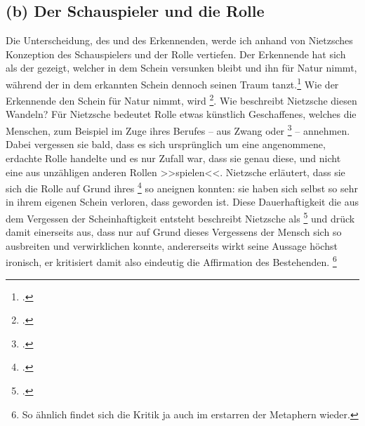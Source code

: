 \documentclass[12pt, a4paper, openany]{report}
\begin{document}
\subsection{(b) Der Schauspieler und die Rolle}
Die Unterscheidung, des  und des Erkennenden, werde ich anhand von Nietzsches Konzeption des Schauspielers und der Rolle vertiefen. 
Der Erkennende hat sich als der gezeigt, welcher in dem Schein versunken bleibt und ihn für Natur nimmt, während der  in dem erkannten Schein dennoch seinen Traum tanzt.\footcite[Vgl.][417]{nietzsche_morgenrote_1999}
Wie der Erkennende den Schein für Natur nimmt, wird \footcite[][595]{nietzsche_morgenrote_1999}.
Wie beschreibt Nietzsche diesen Wandeln?
Für Nietzsche bedeutet Rolle etwas künstlich Geschaffenes, welches die Menschen, zum Beispiel im Zuge ihres Berufes -- aus Zwang oder \footcite[][595]{nietzsche_morgenrote_1999} -- annehmen. 
Dabei vergessen sie bald, dass es sich ursprünglich um eine angenommene, erdachte Rolle handelte und es nur Zufall war, dass sie genau diese, und nicht eine aus unzähligen anderen Rollen >>spielen<<.
Nietzsche erläutert, dass sie sich die Rolle auf Grund ihres \footcite[][595]{nietzsche_morgenrote_1999} so aneignen konnten:
sie haben sich selbst so sehr in ihrem eigenen Schein verloren, dass  geworden ist. 
Diese Dauerhaftigkeit die aus dem Vergessen der Scheinhaftigkeit entsteht beschreibt Nietzsche als \footcite[][595]{nietzsche_morgenrote_1999} und drück damit einerseits aus, dass nur auf Grund dieses Vergessens der Mensch sich so ausbreiten und verwirklichen konnte, andererseits wirkt seine Aussage höchst ironisch, er kritisiert damit also eindeutig die Affirmation des Bestehenden.%
\footnote{
    So ähnlich findet sich die Kritik ja auch im erstarren der Metaphern wieder.
}\\ 
\end{document}

